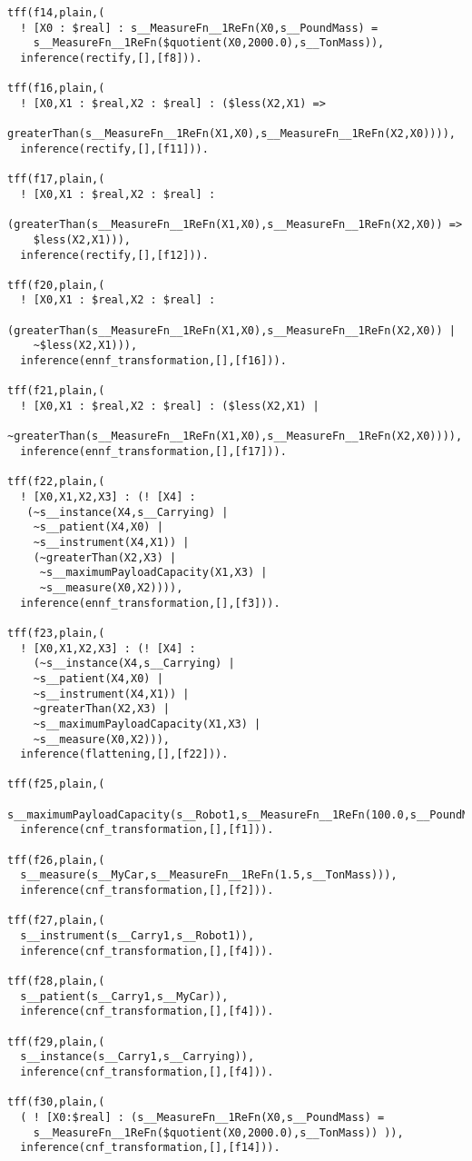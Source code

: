 \documentclass{article}
\begin{document}
\begin{verbatim}
tff(f14,plain,(
  ! [X0 : $real] : s__MeasureFn__1ReFn(X0,s__PoundMass) = 
    s__MeasureFn__1ReFn($quotient(X0,2000.0),s__TonMass)),
  inference(rectify,[],[f8])).

tff(f16,plain,(
  ! [X0,X1 : $real,X2 : $real] : ($less(X2,X1) => 
    greaterThan(s__MeasureFn__1ReFn(X1,X0),s__MeasureFn__1ReFn(X2,X0)))),
  inference(rectify,[],[f11])).

tff(f17,plain,(
  ! [X0,X1 : $real,X2 : $real] : 
    (greaterThan(s__MeasureFn__1ReFn(X1,X0),s__MeasureFn__1ReFn(X2,X0)) => 
    $less(X2,X1))),
  inference(rectify,[],[f12])).

tff(f20,plain,(
  ! [X0,X1 : $real,X2 : $real] : 
    (greaterThan(s__MeasureFn__1ReFn(X1,X0),s__MeasureFn__1ReFn(X2,X0)) |
    ~$less(X2,X1))),
  inference(ennf_transformation,[],[f16])).

tff(f21,plain,(
  ! [X0,X1 : $real,X2 : $real] : ($less(X2,X1) | 
    ~greaterThan(s__MeasureFn__1ReFn(X1,X0),s__MeasureFn__1ReFn(X2,X0)))),
  inference(ennf_transformation,[],[f17])).

tff(f22,plain,(
  ! [X0,X1,X2,X3] : (! [X4] : 
   (~s__instance(X4,s__Carrying) | 
    ~s__patient(X4,X0) | 
    ~s__instrument(X4,X1)) | 
    (~greaterThan(X2,X3) | 
     ~s__maximumPayloadCapacity(X1,X3) | 
     ~s__measure(X0,X2)))),
  inference(ennf_transformation,[],[f3])).

tff(f23,plain,(
  ! [X0,X1,X2,X3] : (! [X4] : 
    (~s__instance(X4,s__Carrying) | 
    ~s__patient(X4,X0) | 
    ~s__instrument(X4,X1)) | 
    ~greaterThan(X2,X3) | 
    ~s__maximumPayloadCapacity(X1,X3) | 
    ~s__measure(X0,X2))),
  inference(flattening,[],[f22])).

tff(f25,plain,(
  s__maximumPayloadCapacity(s__Robot1,s__MeasureFn__1ReFn(100.0,s__PoundMass))),
  inference(cnf_transformation,[],[f1])).

tff(f26,plain,(
  s__measure(s__MyCar,s__MeasureFn__1ReFn(1.5,s__TonMass))),
  inference(cnf_transformation,[],[f2])).

tff(f27,plain,(
  s__instrument(s__Carry1,s__Robot1)),
  inference(cnf_transformation,[],[f4])).

tff(f28,plain,(
  s__patient(s__Carry1,s__MyCar)),
  inference(cnf_transformation,[],[f4])).

tff(f29,plain,(
  s__instance(s__Carry1,s__Carrying)),
  inference(cnf_transformation,[],[f4])).

tff(f30,plain,(
  ( ! [X0:$real] : (s__MeasureFn__1ReFn(X0,s__PoundMass) = 
    s__MeasureFn__1ReFn($quotient(X0,2000.0),s__TonMass)) )),
  inference(cnf_transformation,[],[f14])).


\end{verbatim}
\end{document}
